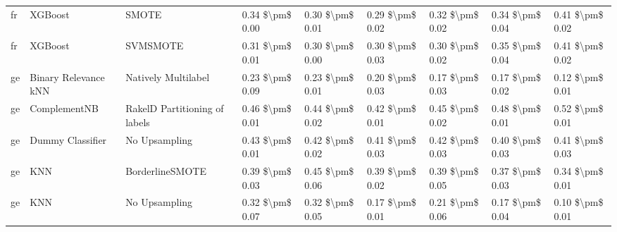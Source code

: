 \begin{tabular}{lllllllll}
      fr &                         XGBoost &                         SMOTE & 0.34 \$\textbackslash pm\$ 0.00 &           0.30 \$\textbackslash pm\$ 0.01 &       0.29 \$\textbackslash pm\$ 0.02 &        0.32 \$\textbackslash pm\$ 0.02 &                         0.34 \$\textbackslash pm\$ 0.04 &     0.41 \$\textbackslash pm\$ 0.02 \\
      fr &                         XGBoost &                      SVMSMOTE & 0.31 \$\textbackslash pm\$ 0.01 &           0.30 \$\textbackslash pm\$ 0.00 &       0.30 \$\textbackslash pm\$ 0.03 &        0.30 \$\textbackslash pm\$ 0.02 &                         0.35 \$\textbackslash pm\$ 0.04 &     0.41 \$\textbackslash pm\$ 0.02 \\
      ge &            Binary Relevance kNN &           Natively Multilabel & 0.23 \$\textbackslash pm\$ 0.09 &           0.23 \$\textbackslash pm\$ 0.01 &       0.20 \$\textbackslash pm\$ 0.03 &        0.17 \$\textbackslash pm\$ 0.03 &                         0.17 \$\textbackslash pm\$ 0.02 &     0.12 \$\textbackslash pm\$ 0.01 \\
      ge &                    ComplementNB & RakelD Partitioning of labels & 0.46 \$\textbackslash pm\$ 0.01 &           0.44 \$\textbackslash pm\$ 0.02 &       0.42 \$\textbackslash pm\$ 0.01 &        0.45 \$\textbackslash pm\$ 0.02 &                         0.48 \$\textbackslash pm\$ 0.01 &     0.52 \$\textbackslash pm\$ 0.01 \\
      ge &                Dummy Classifier &                 No Upsampling & 0.43 \$\textbackslash pm\$ 0.01 &           0.42 \$\textbackslash pm\$ 0.02 &       0.41 \$\textbackslash pm\$ 0.03 &        0.42 \$\textbackslash pm\$ 0.03 &                         0.40 \$\textbackslash pm\$ 0.03 &     0.41 \$\textbackslash pm\$ 0.03 \\
      ge &                             KNN &               BorderlineSMOTE & 0.39 \$\textbackslash pm\$ 0.03 &           0.45 \$\textbackslash pm\$ 0.06 &       0.39 \$\textbackslash pm\$ 0.02 &        0.39 \$\textbackslash pm\$ 0.05 &                         0.37 \$\textbackslash pm\$ 0.03 &     0.34 \$\textbackslash pm\$ 0.01 \\
      ge &                             KNN &                 No Upsampling & 0.32 \$\textbackslash pm\$ 0.07 &           0.32 \$\textbackslash pm\$ 0.05 &       0.17 \$\textbackslash pm\$ 0.01 &        0.21 \$\textbackslash pm\$ 0.06 &                         0.17 \$\textbackslash pm\$ 0.04 &     0.10 \$\textbackslash pm\$ 0.01 \\

\end{tabular}
